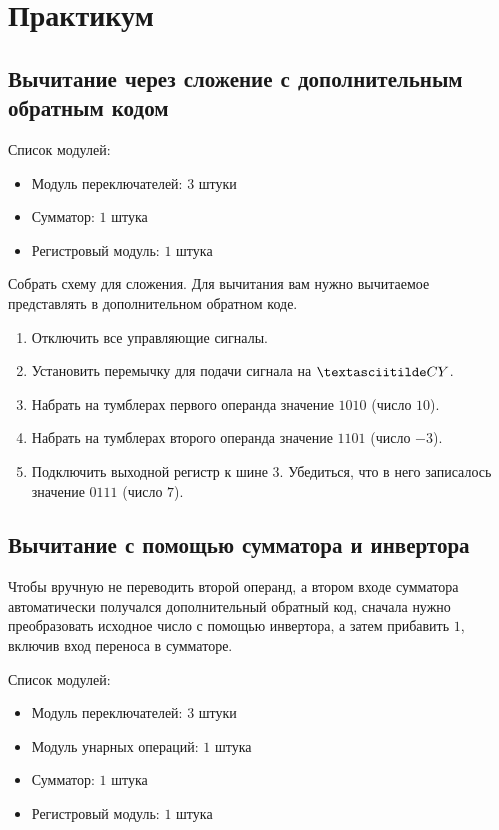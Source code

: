 \section{Практикум}

\subsection{Вычитание через сложение с дополнительным обратным кодом}

Список модулей:
\begin{itemize}
    \item Модуль переключателей: $3$ штуки
    \item Сумматор: $1$ штука
    \item Регистровый модуль: $1$ штука
\end{itemize}

Собрать схему для сложения.
Для вычитания вам нужно вычитаемое представлять в дополнительном обратном
коде.

\begin{enumerate}
    \item Отключить все управляющие сигналы.
    \item Установить перемычку для подачи сигнала на $\textasciitilde CY$.
    \item Набрать на тумблерах первого операнда значение $1010$ (число $10$).
    \item Набрать на тумблерах второго операнда значение $1101$ (число $-3$).
    \item Подключить выходной регистр к шине $3$. Убедиться, что в него записалось значение $0111$ (число $7$).
\end{enumerate}

\subsection{Вычитание с помощью сумматора и инвертора}

Чтобы вручную не переводить второй операнд, а втором входе сумматора автоматически получался дополнительный
обратный код, сначала нужно преобразовать исходное число с помощью инвертора, а затем прибавить $1$,
включив вход переноса в сумматоре.

Список модулей:
\begin{itemize}
    \item Модуль переключателей: $3$ штуки
    \item Модуль унарных операций: $1$ штука
    \item Сумматор: $1$ штука
    \item Регистровый модуль: $1$ штука
\end{itemize}

